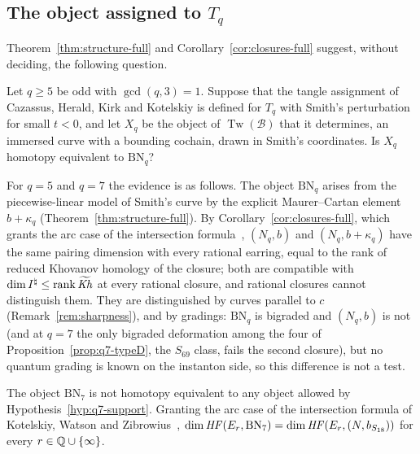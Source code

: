 \subsection{The object assigned to \texorpdfstring{$T_q$}{T\_q}}\label{ss:kh-question}
Theorem~\ref{thm:structure-full} and Corollary~\ref{cor:closures-full} suggest, without deciding, the
following question.

\begin{question}\label{q:arc-full}
Let $q\ge5$ be odd with $\gcd(q,3)=1$.  Suppose that the tangle assignment of Cazassus, Herald, Kirk and
Kotelskiy is defined for $T_q$ with Smith's perturbation for small $t<0$, and let $X_q$ be the object of $\operatorname{Tw}(\mathcal
B)$ that it determines, an immersed curve with a bounding cochain, drawn in Smith's coordinates.  Is
$X_q$ homotopy equivalent to $\mathrm{BN}_q$?
\end{question}

For $q=5$ and $q=7$ the evidence is as follows.  The object $\mathrm{BN}_q$ arises from the
piecewise-linear model of Smith's curve by the explicit Maurer--Cartan element $b+\kappa_q$
(Theorem~\ref{thm:structure-full}).  By Corollary~\ref{cor:closures-full}, which grants the arc case of the intersection formula~\cite[Thm.~5.25]{KWZ}, $(N_q,b)$ and
$(N_q,b+\kappa_q)$ have the same pairing dimension with every rational earring, equal to the rank of reduced
Khovanov homology of the closure; both are compatible with $\dim I^{\natural}\le\operatorname{rank}\widetilde{\mathit{Kh}}$ at every
rational closure, and rational closures cannot distinguish them.  They are distinguished by curves
parallel to $c$ (Remark~\ref{rem:sharpness}), and by gradings: $\mathrm{BN}_q$ is bigraded
and $(N_q,b)$ is not (and at $q=7$ the only bigraded deformation among the four of
Proposition~\ref{prop:q7-typeD}, the $S_{69}$ class, fails the second closure), but no quantum grading is
known on the instanton side, so this difference is not a test.

\begin{proposition}\label{prop:hyp-conflict}
The object $\mathrm{BN}_7$ is not homotopy equivalent to any object allowed by
Hypothesis~\ref{hyp:q7-support}.  Granting the arc case of the intersection formula of Kotelskiy, Watson
and Zibrowius~\cite[Thm.~5.25]{KWZ}, $\dim\mathit{HF}(E_r,\mathrm{BN}_7)=\dim\mathit{HF}(E_r,(N,b_{S_{18}}))$ for every
$r\in\mathbb{Q}\cup\{\infty\}$.
\end{proposition}

